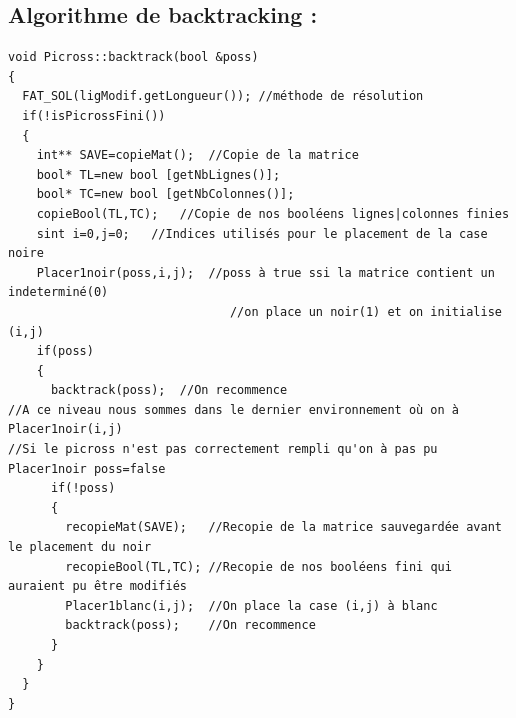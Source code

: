 \documentclass{article}
\begin{document}
\subsection{Algorithme de backtracking :}
\begin{verbatim}
void Picross::backtrack(bool &poss)
{
  FAT_SOL(ligModif.getLongueur()); //méthode de résolution
  if(!isPicrossFini())
  {
    int** SAVE=copieMat();	//Copie de la matrice
    bool* TL=new bool [getNbLignes()];
    bool* TC=new bool [getNbColonnes()];
    copieBool(TL,TC);	//Copie de nos booléens lignes|colonnes finies
    sint i=0,j=0;	//Indices utilisés pour le placement de la case noire
    Placer1noir(poss,i,j);	//poss à true ssi la matrice contient un indeterminé(0) 
                               //on place un noir(1) et on initialise (i,j)
    if(poss)
    {
      backtrack(poss);	//On recommence
//A ce niveau nous sommes dans le dernier environnement où on à Placer1noir(i,j)
//Si le picross n'est pas correctement rempli qu'on à pas pu Placer1noir poss=false
      if(!poss)
      {
        recopieMat(SAVE);	//Recopie de la matrice sauvegardée avant le placement du noir
        recopieBool(TL,TC);	//Recopie de nos booléens fini qui auraient pu être modifiés
        Placer1blanc(i,j);	//On place la case (i,j) à blanc
        backtrack(poss);	//On recommence
      }
    }
  }
}
\end{verbatim}
\end{document}
